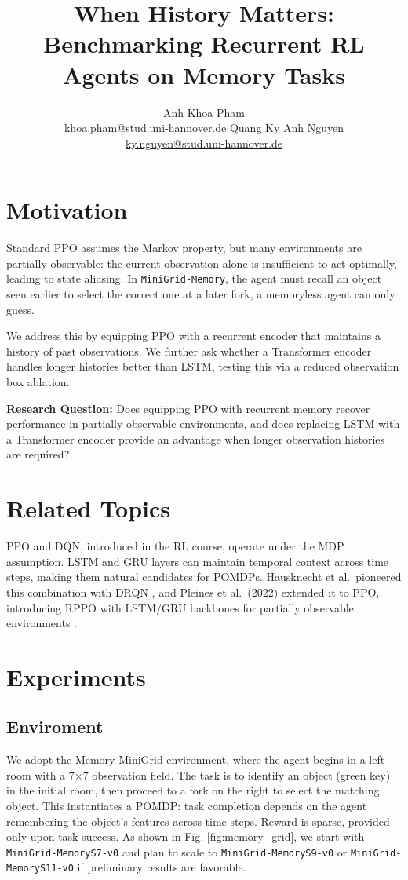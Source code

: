 \documentclass{article}
\title{When History Matters: Benchmarking Recurrent RL Agents on Memory Tasks}
\author{%
  Anh Khoa Pham \\\href{mailto:khoa.pham@uni-hannover.de}{khoa.pham@stud.uni-hannover.de} %
  \And
  Quang Ky Anh Nguyen  \\\href{mailto:ky.nguyen@stud.uni-hannover.de}{ky.nguyen@stud.uni-hannover.de} %
}
\begin{document}
\maketitle
\section{Motivation}

Standard PPO assumes the Markov property, but many environments are partially observable: the current observation alone is insufficient to act optimally, leading to state aliasing. In \texttt{MiniGrid-Memory}, the agent must recall an object seen earlier to select the correct one at a later fork, a memoryless agent can only guess.

We address this by equipping PPO with a recurrent encoder that maintains a history of past observations. We further ask whether a Transformer encoder handles longer histories better than LSTM, testing this via a reduced observation box ablation.

\textbf{Research Question:} Does equipping PPO with recurrent memory recover performance in partially observable environments, and does replacing LSTM with a Transformer encoder provide an advantage when longer observation histories are required?

\section{Related Topics}

PPO and DQN, introduced in the RL course, operate under the MDP assumption. LSTM and GRU layers can maintain temporal context across time steps, making them natural candidates for POMDPs. Hausknecht et al.\ pioneered this combination with DRQN \cite{drqn}, and Pleines et al.\ (2022) extended it to PPO, introducing RPPO with LSTM/GRU backbones for partially observable environments \cite{rppo}.

\section{Experiments}
\subsection{Enviroment}
We adopt the Memory MiniGrid environment, where the agent begins in a left room with a 7×7 observation field. The task is to identify an object (green key) in the initial room, then proceed to a fork on the right to select the matching object. This instantiates a POMDP: task completion depends on the agent remembering the object's features across time steps. Reward is sparse, provided only upon task success. As shown in Fig. \ref{fig:memory_grid}, we start with \texttt{MiniGrid-MemoryS7-v0} and plan to scale to \texttt{MiniGrid-MemoryS9-v0} or \texttt{MiniGrid-MemoryS11-v0} if preliminary results are favorable.
\end{document}

